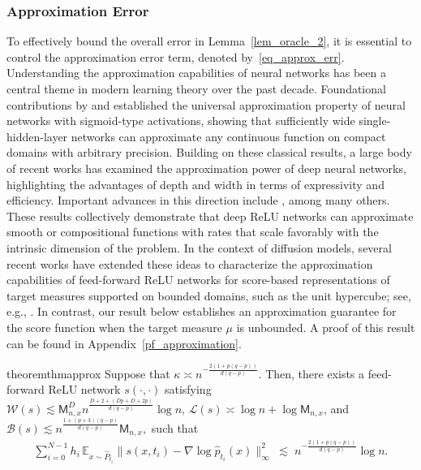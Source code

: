 \documentclass[12pts]{article}
\newcommand{\cB}{ \mathcal{B}}
\newcommand{\cL}{ \mathcal{L}}
\newcommand{\cW}{ \mathcal{W}}
\newcommand{\E}{\mathbb{E}}
\begin{document}
\subsubsection{Approximation Error}
To effectively bound the overall error in Lemma~\ref{lem_oracle_2}, it is essential to control the approximation error term, denoted by~\eqref{eq_approx_err}. Understanding the approximation capabilities of neural networks has been a central theme in modern learning theory over the past decade. Foundational contributions by \citet{cybenko1989approximation} and \citet{hornik1991approximation} established the universal approximation property of neural networks with sigmoid-type activations, showing that sufficiently wide single-hidden-layer networks can approximate any continuous function on compact domains with arbitrary precision. Building on these classical results, a large body of recent works has examined the approximation power of deep neural networks, highlighting the advantages of depth and width in terms of expressivity and efficiency. Important advances in this direction include \citet{yarotsky2017error, petersen2018optimal, shen2019nonlinear, schmidt2020nonparametric, lu2021deep}, among many others. These results collectively demonstrate that deep ReLU networks can approximate smooth or compositional functions with rates that scale favorably with the intrinsic dimension of the problem. In the context of diffusion models, several recent works have extended these ideas to characterize the approximation capabilities of feed-forward ReLU networks for score-based representations of target measures supported on bounded domains, such as the unit hypercube; see, e.g., \citet{pmlr-v238-tang24a, oko2023diffusion}. In contrast, our result below establishes an approximation guarantee for the score function when the target measure $\mu$ is unbounded. A proof of this result can be found in Appendix~\ref{pf_approximation}.
\begin{restatable}{theorem}{thmapprox}
\label{approx_thm}
Suppose that $\kappa \asymp  n^{-\frac{2 (1+p(q-p))}{d(q-p)}} $. Then, there exists a feed-forward ReLU network $s(\cdot, \cdot)$ satisfying 
$\cW(s) \lesssim \mathsf{M}_{n,x}^D 
n^{\frac{D+2 + (Dp + D + 2p)}{d(q-p)}} \log n
,\, 
\cL(s)  \asymp \log n + \log \mathsf{M}_{n,x}$, and  $ \cB(s) \lesssim n^{\frac{1+(p+3)(q-p)}{d(q-p)}} \mathsf{M}_{n,x},$
such that
\begin{align}
\sum_{i=0}^{N-1} h_i \,
\E_{x \sim \hat{P}_{t_i}}
\bigl\|
s(x, t_i) - \nabla \log \hat{p}_{t_i}(x)
\bigr\|^2_\infty
\;\lesssim\;
n^{-\frac{2 (1+p(q-p))}{d(q-p)}} \log n.
\label{e29}
\end{align}
\end{restatable}
\end{document}
